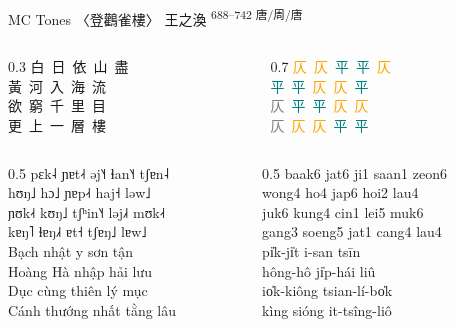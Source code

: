 \documentclass{beamer}
\begin{document}
\begin{frame}[fragile]{MC Tones}
〈登鸛雀樓〉 王之渙 \textsuperscript{688–742 唐/周/唐}
\medskip
\begin{columns}
\begin{column}{0.3\textwidth}
白\ 日\ 依\ 山\ 盡\\
黃\ 河\ 入\ 海\ 流\\ 
欲\ 窮\ 千\ 里\ 目\\
更\ 上\ 一\ 層\ 樓\\ 
\end{column}    
\begin{column}{0.7\textwidth}
\textcolor{orange}{仄}\ \textcolor{orange}{仄}\ \textcolor{teal}{平}\ \textcolor{teal}{平}\ \textcolor{orange}{仄}\\
\textcolor{teal}{平}\ \textcolor{teal}{平}\ \textcolor{orange}{仄}\ \textcolor{orange}{仄}\ \textcolor{teal}{平}\\
\textcolor{gray}{仄}\ \textcolor{teal}{平}\ \textcolor{teal}{平}\ \textcolor{orange}{仄}\ \textcolor{orange}{仄}\\
\textcolor{gray}{仄}\ \textcolor{orange}{仄}\ \textcolor{orange}{仄}\ \textcolor{teal}{平}\ \textcolor{teal}{平}\\
\end{column}
\end{columns}  
\bigskip
\begin{columns}
    \begin{column}{0.5\textwidth}
    pɛk˨ ɲɐt˨˧ əj˥˧ ɬan˥˧ tʃɐn˨\\
    hʊŋ˩ hɔ˩ ɲɐp˨˧ haj˧ ləw˩\\
    ɲʊk˨˧ kʊŋ˩ tʃʰin˥˧ ləj˩˧ mʊk˨˧\\
    kɐŋ˥ ɬɐŋ˩˧ ɐt˧ tʃɐŋ˩ lɐw˩\\
    \medskip
    Bạch nhật y sơn tận\\
    Hoàng Hà nhập hải lưu\\
    Dục cùng thiên lý mục\\
    Cánh thướng nhất tằng lâu\\
    \end{column}
    \begin{column}{0.5\textwidth}
    baak6 jat6 ji1 saan1 zeon6\\
    wong4 ho4 jap6 hoi2 lau4\\
    juk6 kung4 cin1 lei5 muk6\\
    gang3 soeng5 jat1 cang4 lau4\\
    \medskip
    pi̍k-ji̍t i-san tsīn\\
    hông-hô ji̍p-hái liû\\
    io̍k-kiông tsian-lí-bo̍k\\
    kìng sióng it-tsîng-liô\\
    \end{column}
\end{columns}

\end{frame}
\end{document}
